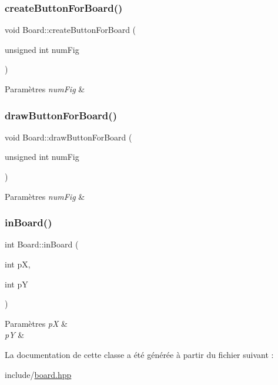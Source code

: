 \subsubsection{\texorpdfstring{create\+Button\+For\+Board()}{createButtonForBoard()}}
{\footnotesize\ttfamily void Board\+::create\+Button\+For\+Board (\begin{DoxyParamCaption}\item[{unsigned int}]{num\+Fig }\end{DoxyParamCaption})}


\begin{DoxyParams}{Paramètres}
{\em num\+Fig} & \\
\hline
\end{DoxyParams}
\mbox{\label{class_board_acf0a6b5036a711d3ef207356f330d830}} 
\subsubsection{\texorpdfstring{draw\+Button\+For\+Board()}{drawButtonForBoard()}}
{\footnotesize\ttfamily void Board\+::draw\+Button\+For\+Board (\begin{DoxyParamCaption}\item[{unsigned int}]{num\+Fig }\end{DoxyParamCaption})}


\begin{DoxyParams}{Paramètres}
{\em num\+Fig} & \\
\hline
\end{DoxyParams}
\mbox{\label{class_board_ac61d62b0969aa0a9f58d280d86bfd011}} 
\subsubsection{\texorpdfstring{in\+Board()}{inBoard()}}
{\footnotesize\ttfamily int Board\+::in\+Board (\begin{DoxyParamCaption}\item[{int}]{pX,  }\item[{int}]{pY }\end{DoxyParamCaption})}


\begin{DoxyParams}{Paramètres}
{\em pX} & \\
\hline
{\em pY} & \\
\hline
\end{DoxyParams}


La documentation de cette classe a été générée à partir du fichier suivant \+:\begin{DoxyCompactItemize}
\item 
include/\hyperlink{board_8hpp}{board.\+hpp}\end{DoxyCompactItemize}

